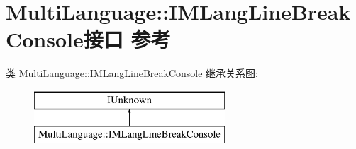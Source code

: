 \hypertarget{interface_multi_language_1_1_i_m_lang_line_break_console}{}\section{Multi\+Language\+:\+:I\+M\+Lang\+Line\+Break\+Console接口 参考}
\label{interface_multi_language_1_1_i_m_lang_line_break_console}
类 Multi\+Language\+:\+:I\+M\+Lang\+Line\+Break\+Console 继承关系图\+:\begin{figure}[H]
\begin{center}
\leavevmode
\includegraphics[height=2.000000cm]{interface_multi_language_1_1_i_m_lang_line_break_console}
\end{center}
\end{figure}
